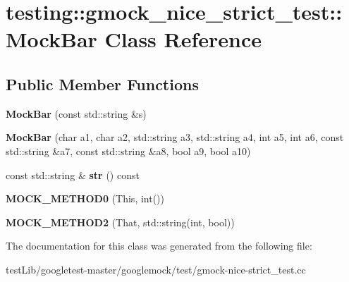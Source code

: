 \hypertarget{classtesting_1_1gmock__nice__strict__test_1_1MockBar}{}\section{testing\+:\+:gmock\+\_\+nice\+\_\+strict\+\_\+test\+:\+:Mock\+Bar Class Reference}
\label{classtesting_1_1gmock__nice__strict__test_1_1MockBar}
\subsection*{Public Member Functions}
\begin{DoxyCompactItemize}
\item 
\mbox{\label{classtesting_1_1gmock__nice__strict__test_1_1MockBar_abd4e7936dc389201ce608257f7a02584}} 
{\bfseries Mock\+Bar} (const std\+::string \&s)
\item 
\mbox{\label{classtesting_1_1gmock__nice__strict__test_1_1MockBar_ad6b73066fdcdd71ac1add73ef56b53ef}} 
{\bfseries Mock\+Bar} (char a1, char a2, std\+::string a3, std\+::string a4, int a5, int a6, const std\+::string \&a7, const std\+::string \&a8, bool a9, bool a10)
\item 
\mbox{\label{classtesting_1_1gmock__nice__strict__test_1_1MockBar_adc0fb56c042e95e1a459bb007e813169}} 
const std\+::string \& {\bfseries str} () const
\item 
\mbox{\label{classtesting_1_1gmock__nice__strict__test_1_1MockBar_a9aad688c2b1dc6b529b7c499e49e3a70}} 
{\bfseries M\+O\+C\+K\+\_\+\+M\+E\+T\+H\+O\+D0} (This, int())
\item 
\mbox{\label{classtesting_1_1gmock__nice__strict__test_1_1MockBar_afa41d45dd7066f014f755f152ec16a73}} 
{\bfseries M\+O\+C\+K\+\_\+\+M\+E\+T\+H\+O\+D2} (That, std\+::string(int, bool))
\end{DoxyCompactItemize}


The documentation for this class was generated from the following file\+:\begin{DoxyCompactItemize}
\item 
test\+Lib/googletest-\/master/googlemock/test/gmock-\/nice-\/strict\+\_\+test.\+cc\end{DoxyCompactItemize}
